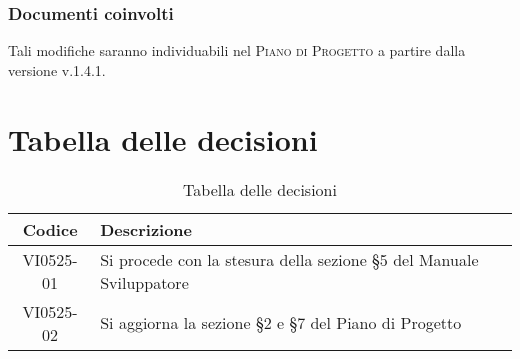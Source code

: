 \documentclass{article}
\begin{document}
\subsubsection*{Documenti coinvolti}
Tali modifiche saranno individuabili nel \textsc{Piano di Progetto} a partire dalla versione v.1.4.1.


\section{Tabella delle decisioni}%
\label{sub:decisioni}

\begin{table}[!ht]
	\centering
	\begin{tabular}{|c|p{13cm}|}
		\hline
		\rowcolor{lightgray}
		\textbf{Codice} & \textbf{Descrizione} \\
		\hline
			VI0525-01 & Si procede con la stesura della sezione \S5 del Manuale Sviluppatore \\
            VI0525-02 & Si aggiorna la sezione \S2 e \S7 del Piano di Progetto \\
		\hline
	\end{tabular}
	\caption{Tabella delle decisioni}
\end{table}
\end{document}
